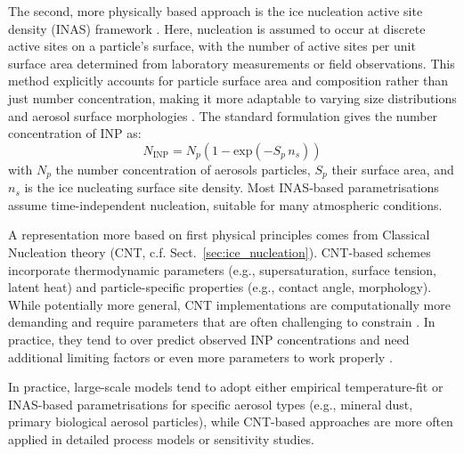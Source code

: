The second, more physically based approach is the ice nucleation active site density (INAS) framework \citep{fletcher_active_1969, vali_quantitative_1971}. Here, nucleation is assumed to occur at discrete active sites on a particle’s surface, with the number of active sites per unit surface area determined from laboratory measurements or field observations. This method explicitly accounts for particle surface area and composition rather than just number concentration, making it more adaptable to varying size distributions and aerosol surface morphologies \citep[e.g.][]{niemand_particle-surface-area-based_2012, hummel_simulating_2018, ullrich_new_2017}. The standard formulation gives the number concentration of INP as:
\begin{equation}
        N_{\text{INP}} = N_{p} \left( 1 - \text{exp}(-S_{p} \, n_s)\right)
    \end{equation}
    with $N_{p}$ the number concentration of aerosols particles, $S_{p}$ their surface area, and $n_s$ is the ice nucleating surface site density.
Most INAS-based parametrisations assume time-independent nucleation, suitable for many atmospheric conditions.

A representation more based on first physical principles comes from Classical Nucleation theory (CNT, c.f. Sect.~\ref{sec:ice_nucleation}). CNT-based schemes incorporate thermodynamic parameters (e.g., supersaturation, surface tension, latent heat) and particle-specific properties (e.g., contact angle, morphology). While potentially more general, CNT implementations are computationally more demanding and require parameters that are often challenging to constrain \citep[e.g.][]{barahona_ice_2012, hoose_heterogeneous_2012, savre_theory-based_2015}.
In practice, they tend to over predict observed INP concentrations and need additional limiting factors or even more parameters to work properly \citep{hoose_how_2010}. 

In practice, large-scale models tend to adopt either empirical temperature-fit or INAS-based parametrisations for specific aerosol types (e.g., mineral dust, primary biological aerosol particles), while CNT-based approaches are more often applied in detailed process models or sensitivity studies.


